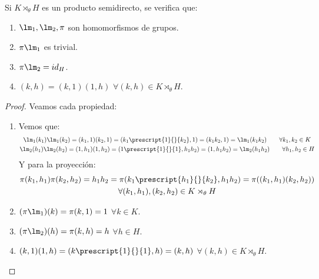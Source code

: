 \begin{prop}
    Si $K\rtimes_\theta H$ es un producto semidirecto, se verifica que:
    \begin{enumerate}
        \item $\lm_1, \lm_2, \pi$ son homomorfismos de grupos.
        \item $\pi \lm_1$ es trivial.
        \item $\pi\lm_2 = id_H$.
        \item $(k,h) = (k,1)(1,h)$ $\forall (k,h) \in K\rtimes_\theta H$.
    \end{enumerate}
    \begin{proof}
        Veamos cada propiedad:
        \begin{enumerate}
            \item Vemos que:
                \begin{gather*}
                    \lm_1(k_1)\lm_1(k_2) = (k_1,1)(k_2,1) = (k_1 \prescript{1}{}{k_2},1) = (k_1k_2, 1) = \lm_1(k_1k_2) \qquad \forall k_1,k_2 \in K \\
                    \lm_2(h_1)\lm_2(h_2) = (1,h_1)(1,h_2) = (1\prescript{1}{}{1},h_1h_2) = (1,h_1h_2) = \lm_2(h_1h_2) \qquad \forall h_1,h_2 \in H 
                \end{gather*}
                Y para la proyección:
                \begin{multline*}
                    \pi(k_1,h_1)\pi(k_2,h_2) = h_1h_2 = \pi(k_1\prescript{h_1}{}{k_2},h_1h_2) = \pi((k_1,h_1)(k_2,h_2)) \\ \forall (k_1,h_1),(k_2,h_2) \in K\rtimes_\theta H
                \end{multline*}
            \item $(\pi\lm_1)(k) = \pi(k,1) = 1$ $\forall k\in K$.
            \item $(\pi\lm_2)(h) = \pi(k,h) = h$ $\forall h\in H$.
            \item $(k,1)(1,h) = (k\prescript{1}{}{1},h) = (k,h)$ $\forall (k,h)\in K\rtimes_\theta H$.
        \end{enumerate}
    \end{proof}
\end{prop}

